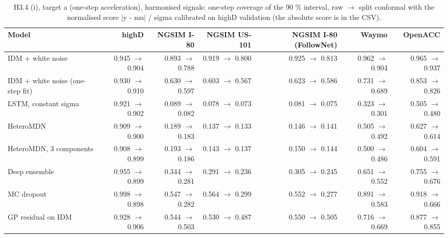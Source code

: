 \begin{table}[htbp]
\centering
\footnotesize
\caption{H3.4 (i), target a (one-step acceleration), harmonised signals: one-step coverage of the 90 \% interval, raw $\rightarrow$ split conformal with the normalised score $|$y - mu$|$ / sigma calibrated on highD validation (the absolute score is in the CSV).}
\label{tab:t4-onestep-conformal--harmonised--a}
\begin{tabular}{lrrrrrr}
\toprule
Model & highD & NGSIM I-80 & NGSIM US-101 & NGSIM I-80 (FollowNet) & Waymo & OpenACC \\
\midrule
IDM + white noise & 0.945 $\rightarrow$ 0.904 & 0.893 $\rightarrow$ 0.788 & 0.919 $\rightarrow$ 0.800 & 0.925 $\rightarrow$ 0.813 & 0.962 $\rightarrow$ 0.904 & 0.965 $\rightarrow$ 0.937 \\
IDM + white noise (one-step fit) & 0.930 $\rightarrow$ 0.910 & 0.630 $\rightarrow$ 0.597 & 0.603 $\rightarrow$ 0.567 & 0.623 $\rightarrow$ 0.586 & 0.731 $\rightarrow$ 0.689 & 0.853 $\rightarrow$ 0.826 \\
LSTM, constant sigma & 0.921 $\rightarrow$ 0.902 & 0.089 $\rightarrow$ 0.082 & 0.078 $\rightarrow$ 0.073 & 0.081 $\rightarrow$ 0.075 & 0.323 $\rightarrow$ 0.301 & 0.505 $\rightarrow$ 0.480 \\
HeteroMDN & 0.909 $\rightarrow$ 0.900 & 0.189 $\rightarrow$ 0.183 & 0.137 $\rightarrow$ 0.133 & 0.146 $\rightarrow$ 0.141 & 0.505 $\rightarrow$ 0.492 & 0.627 $\rightarrow$ 0.614 \\
HeteroMDN, 3 components & 0.908 $\rightarrow$ 0.899 & 0.193 $\rightarrow$ 0.186 & 0.143 $\rightarrow$ 0.137 & 0.150 $\rightarrow$ 0.144 & 0.500 $\rightarrow$ 0.486 & 0.604 $\rightarrow$ 0.591 \\
Deep ensemble & 0.955 $\rightarrow$ 0.899 & 0.344 $\rightarrow$ 0.281 & 0.291 $\rightarrow$ 0.236 & 0.305 $\rightarrow$ 0.245 & 0.651 $\rightarrow$ 0.552 & 0.755 $\rightarrow$ 0.676 \\
MC dropout & 0.998 $\rightarrow$ 0.898 & 0.547 $\rightarrow$ 0.282 & 0.564 $\rightarrow$ 0.299 & 0.552 $\rightarrow$ 0.277 & 0.891 $\rightarrow$ 0.583 & 0.918 $\rightarrow$ 0.666 \\
GP residual on IDM & 0.928 $\rightarrow$ 0.906 & 0.544 $\rightarrow$ 0.503 & 0.530 $\rightarrow$ 0.487 & 0.550 $\rightarrow$ 0.505 & 0.716 $\rightarrow$ 0.669 & 0.877 $\rightarrow$ 0.855 \\

\end{tabular}
\end{table}
